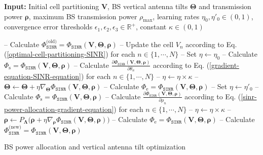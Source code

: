 \begin{algorithm}[ht!]
\SetAlgoLined
{}

\textbf{Input:} Initial cell partitioning $\bm{V}$, BS vertical antenna tilts $\mathbf{\Theta}$ and transmission power $\bm{\rho}$, 
maximum BS transmission power $\rho_{\max}$, learning rates $\eta_0, \eta'_0 \in (0,1)$, 
convergence error thresholds $\epsilon_1, \epsilon_2, \epsilon_3 \in \mathbb{R}^+$, constant $\kappa \in  (0, 1)$\;


{
-- Calculate  $\Phi_{\mathtt{SINR}}^{\textrm{(old)}} = \Phi_{\mathtt{SINR}}\left(\bm{V},\mathbf{\Theta}, \bm{\rho}\right)$\;
-- Update the cell $V_n$ according to Eq. (\ref{optimal-cell-partitioning-SINR}) for each $n \in \{1, \cdots, N\}$\;
-- Set $\eta \gets \eta_0$\;
{
-- Calculate  $\Phi_{\textrm{s}} = \Phi_{\mathtt{SINR}}\left(\bm{V},\mathbf{\Theta},\bm{\rho}\right)$\;
-- Calculate $\frac{\partial \Phi_{\mathtt{SINR}}(\mathbf{V},\mathbf{\Theta},\bm{\rho})}{\partial \theta_n}$ according to Eq. (\ref{gradient-equation-SINR-equation}) for each $n \in \{1, \cdots, N\}$\;
-- $\eta \gets \eta \times \kappa$\;
-- $\mathbf{\Theta} \gets \mathbf{\Theta} + \eta \nabla_{\mathbf{\Theta}} \Phi_{\mathtt{SINR}}(\bm{V},\mathbf{\Theta},\bm{\rho})$\;
-- Calculate $\Phi_{\textrm{e}} = \Phi_{\mathtt{SINR}}\left(\bm{V},\mathbf{\Theta}, \bm{\rho}\right)$\;
}
-- Set $\eta \gets \eta'_0$\;
{
-- Calculate  $\Phi_{\textrm{s}} = \Phi_{\mathtt{SINR}}\left(\bm{V},\mathbf{\Theta}, \bm{\rho}\right)$\;
-- Calculate $\frac{\partial \Phi_{\mathtt{SINR}}(\mathbf{V},\mathbf{\Theta}, \bm{\rho})}{\partial \rho_n}$ according to Eq. (\ref{sinr-power-allocation-gradient-equation}) for each $n \in \{1, \cdots, N\}$\;
-- $\eta \gets \eta \times \kappa$\;
-- $\bm{\rho} \gets P_{\bm{\Lambda}}\big(\bm{\rho} + \eta \nabla_{\bm{\rho}} \Phi_{\mathtt{SINR}}(\bm{V},\mathbf{\Theta}, \bm{\rho})\big)$\;
-- Calculate $\Phi_{\textrm{e}} = \Phi_{\mathtt{SINR}}\left(\bm{V},\mathbf{\Theta}, \bm{\rho}\right)$\;
}
-- Calculate  $\Phi_{\mathtt{SINR}}^{\textrm{(new)}} = \Phi_{\mathtt{SINR}}\left(\bm{V},\mathbf{\Theta}, \bm{\rho}\right)$\;
}
 \caption{BS power allocation and vertical antenna tilt optimization}
 \label{BS_PA_VAT_Algorithm}
\end{algorithm}



